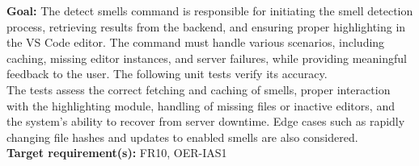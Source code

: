 \documentclass[12pt, titlepage]{article}
\begin{document}
\textbf{Goal:} The detect smells command is responsible for initiating the smell detection process, retrieving results from the backend, and ensuring proper highlighting in the VS Code editor. The command must handle various scenarios, including caching, missing editor instances, and server failures, while providing meaningful feedback to the user. The following unit tests verify its accuracy.\\

\noindent The tests assess the correct fetching and caching of smells, proper interaction with the highlighting module, handling of missing files or inactive editors, and the system's ability to recover from server downtime. Edge cases such as rapidly changing file hashes and updates to enabled smells are also considered.\\

\noindent\textbf{Target requirement(s):} FR10, OER-IAS1~\cite{SRS} \\
\end{document}
